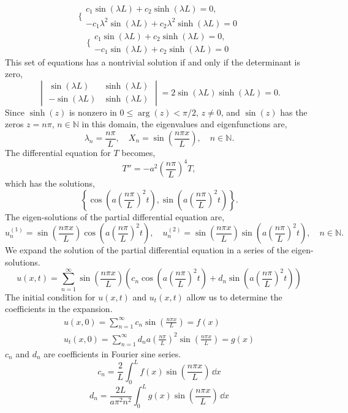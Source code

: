 {\begin{Solution}
  \[
  \Bigg\{
  \begin{matrix}
    c_1 \sin(\lambda L) + c_2 \sinh(\lambda L) = 0, \\
    - c_1 \lambda^2 \sin(\lambda L) + c_2 \lambda^2 \sinh(\lambda L) = 0 
  \end{matrix}
  \]
  \[
  \Bigg\{
  \begin{matrix}
    c_1 \sin(\lambda L) + c_2 \sinh(\lambda L) = 0, \\
    - c_1 \sin(\lambda L) + c_2 \sinh(\lambda L) = 0 
  \end{matrix}
  \]
  This set of equations has a nontrivial solution if and only if the determinant
  is zero,
  \[
  \begin{vmatrix}
    \sin(\lambda L) & \sinh(\lambda L)  \\
    - \sin(\lambda L) & \sinh(\lambda L)  
  \end{vmatrix}
  = 2 \sin(\lambda L) \sinh(\lambda L) = 0.
  \]
  Since $\sinh(z)$ is nonzero in $0 \leq \arg(z) < \pi/2$, $z \neq 0$, and
  $\sin(z)$ has the zeros $z = n \pi$, $n \in \mathbb{N}$ in this domain,
  the eigenvalues and eigenfunctions are,
  \[
  \lambda_n = \frac{n \pi}{L}, \quad
  X_n = \sin \left( \frac{n \pi x}{L} \right), \quad
  n \in \mathbb{N}.
  \]
  The differential equation for $T$ becomes,
  \[
  T'' = - a^2 \left( \frac{n \pi}{L} \right)^4 T,
  \]
  which has the solutions,
  \[
  \left\{ \cos \left( a \left( \frac{n \pi}{L} \right)^2 t \right),
    \sin \left( a \left( \frac{n \pi}{L} \right)^2 t \right) \right\}.
  \]
  The eigen-solutions of the partial differential equation are,
  \[
  u_n^{(1)} = \sin \left( \frac{n \pi x}{L} \right)
  \cos \left( a \left( \frac{n \pi}{L} \right)^2 t \right), \quad
  u_n^{(2)} = \sin \left( \frac{n \pi x}{L} \right)
  \sin \left( a \left( \frac{n \pi}{L} \right)^2 t \right),
  \quad n \in \mathbb{N}.
  \]
  We expand the solution of the partial differential equation in a series of
  the eigen-solutions.
  \[
  \boxed{
    u(x,t) = \sum_{n=1}^\infty 
    \sin \left( \frac{n \pi x}{L} \right)
    \left( c_n \cos \left( a \left( \frac{n \pi}{L} \right)^2 t \right)
      + d_n \sin \left( a \left( \frac{n \pi}{L} \right)^2 t \right) \right)
    }
  \]
  The initial condition for $u(x,t)$ and $u_t(x,t)$ allow us to determine
  the coefficients in the expansion.
  \begin{gather*}
    u(x,0) = \sum_{n=1}^\infty c_n \sin \left( \frac{n \pi x}{L} \right) = f(x) \\
    u_t(x,0) = \sum_{n=1}^\infty d_n a \left( \frac{n \pi}{L} \right)^2 
    \sin \left( \frac{n \pi x}{L} \right) = g(x)
  \end{gather*}
  $c_n$ and $d_n$ are coefficients in Fourier sine series.
  \[
  \boxed{
    c_n = \frac{2}{L} \int_0^L f(x) \sin \left( \frac{n \pi x}{L} \right) \,\dd x
    }
  \]
  \[
  \boxed{
    d_n = \frac{2 L}{a \pi^2 n^2} 
    \int_0^L g(x) \sin \left( \frac{n \pi x}{L} \right) \,\dd x
    }
  \]
\end{Solution}






}
